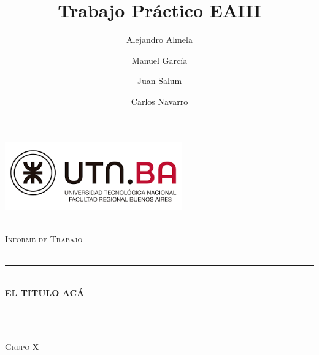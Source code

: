 \title{Trabajo Práctico EAIII}
\author{Alejandro Almela \and Manuel  García \and Juan Salum \and Carlos Navarro} 

\begin{titlepage}
\newcommand{\HRule}{\rule{\linewidth}{0.5mm}} 

\center %
 
\begin{center}
\includegraphics[width=3in]{fig/UTNFRBA.png}\\[0cm] 
\end{center}


\textsc{\large }\\[1cm] %
\textsc{\Large Informe de Trabajo}\\[1cm] %
\textsc{\large }\\[0.1cm] %




\HRule \\[1cm]
{ \Large \bfseries EL TITULO ACÁ}\\[0.4cm] %
\HRule \\[1cm]

\textsc{\large }\\[.1cm] %
\textsc{\Large Grupo X }\\[1cm] %
\textsc{\large }\\[0.1cm] %

 


\end{titlepage}
